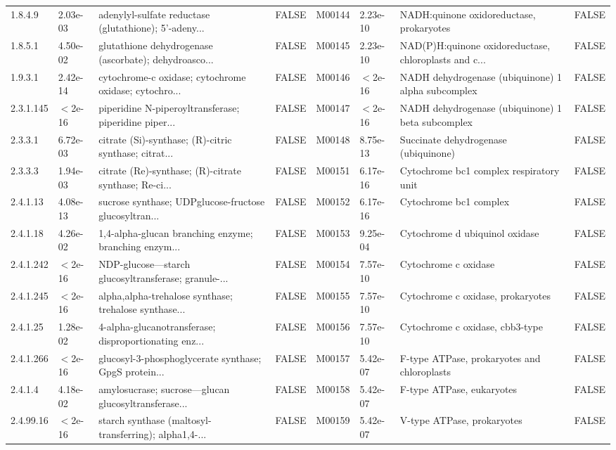 \documentclass{article}\usepackage[]{graphicx}\usepackage[]{color}
\begin{document}
{{\begin{tabular}{llllllll}
  1.8.4.9 &  2.03e-03 & adenylyl-sulfate reductase (glutathione); 5'-adeny... & FALSE & M00144 &  2.23e-10 & NADH:quinone oxidoreductase, prokaryotes & FALSE \\ 
  1.8.5.1 &  4.50e-02 & glutathione dehydrogenase (ascorbate); dehydroasco... & FALSE & M00145 &  2.23e-10 & NAD(P)H:quinone oxidoreductase, chloroplasts and c... & FALSE \\ 
  1.9.3.1 &  2.42e-14 & cytochrome-c oxidase; cytochrome oxidase; cytochro... & FALSE & M00146 & $<$2e-16 & NADH dehydrogenase (ubiquinone) 1 alpha subcomplex & FALSE \\ 
  2.3.1.145 & $<$2e-16 & piperidine N-piperoyltransferase; piperidine piper... & FALSE & M00147 & $<$2e-16 & NADH dehydrogenase (ubiquinone) 1 beta subcomplex & FALSE \\ 
  2.3.3.1 &  6.72e-03 & citrate (Si)-synthase; (R)-citric synthase; citrat... & FALSE & M00148 &  8.75e-13 & Succinate dehydrogenase (ubiquinone) & FALSE \\ 
  2.3.3.3 &  1.94e-03 & citrate (Re)-synthase; (R)-citrate synthase; Re-ci... & FALSE & M00151 &  6.17e-16 & Cytochrome bc1 complex respiratory unit & FALSE \\ 
  2.4.1.13 &  4.08e-13 & sucrose synthase; UDPglucose-fructose glucosyltran... & FALSE & M00152 &  6.17e-16 & Cytochrome bc1 complex & FALSE \\ 
  2.4.1.18 &  4.26e-02 & 1,4-alpha-glucan branching enzyme; branching enzym... & FALSE & M00153 &  9.25e-04 & Cytochrome d ubiquinol oxidase & FALSE \\ 
  2.4.1.242 & $<$2e-16 & NDP-glucose---starch glucosyltransferase; granule-... & FALSE & M00154 &  7.57e-10 & Cytochrome c oxidase & FALSE \\ 
  2.4.1.245 & $<$2e-16 & alpha,alpha-trehalose synthase; trehalose synthase... & FALSE & M00155 &  7.57e-10 & Cytochrome c oxidase, prokaryotes & FALSE \\ 
  2.4.1.25 &  1.28e-02 & 4-alpha-glucanotransferase; disproportionating enz... & FALSE & M00156 &  7.57e-10 & Cytochrome c oxidase, cbb3-type & FALSE \\ 
  2.4.1.266 & $<$2e-16 & glucosyl-3-phosphoglycerate synthase; GpgS protein... & FALSE & M00157 &  5.42e-07 & F-type ATPase, prokaryotes and chloroplasts & FALSE \\ 
  2.4.1.4 &  4.18e-02 & amylosucrase; sucrose---glucan glucosyltransferase... & FALSE & M00158 &  5.42e-07 & F-type ATPase, eukaryotes & FALSE \\ 
  2.4.99.16 & $<$2e-16 & starch synthase (maltosyl-transferring); alpha1,4-... & FALSE & M00159 &  5.42e-07 & V-type ATPase, prokaryotes & FALSE \\ 

\end{tabular}}}
\end{document}

